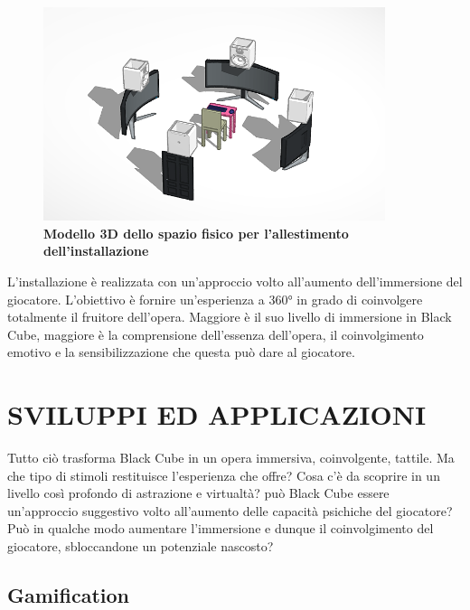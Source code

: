 	\begin{figure}[h]
		\begin{center}
			\includegraphics[width=10cm]{img/image1.png}
			\caption{\textbf{Modello 3D dello spazio fisico per l'allestimento dell'installazione}}
				\label{gr01}
		\end{center}
	\end{figure}

L'installazione è realizzata con un'approccio volto all'aumento dell'immersione del giocatore. L'obiettivo è fornire un'esperienza a 360° in grado di coinvolgere totalmente il fruitore dell'opera. Maggiore è il suo livello di immersione in Black Cube, maggiore è la comprensione dell'essenza dell'opera, il coinvolgimento emotivo e la sensibilizzazione che questa può dare al giocatore.
	
\section*{SVILUPPI ED APPLICAZIONI}
Tutto ciò trasforma Black Cube in un opera immersiva, coinvolgente, tattile. Ma che tipo di stimoli restituisce l'esperienza che offre? Cosa c'è da scoprire in un livello così profondo di astrazione e virtualtà? può Black Cube essere un'approccio suggestivo volto all'aumento delle capacità psichiche del giocatore? Può in qualche modo aumentare l'immersione e dunque il coinvolgimento del giocatore, sbloccandone un potenziale nascosto?

	\subsection*{Gamification}

	
	
	
	

